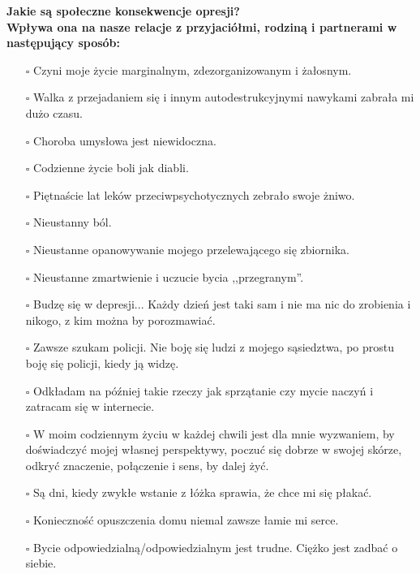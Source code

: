 \noindent\textcolor{ProcessBlue}{\textbf{\Large{Jakie są społeczne konsekwencje opresji?}}}\\
\textbf{\large{Wpływa ona na nasze relacje z przyjaciółmi, rodziną i partnerami w następujący sposób:}}
\begin{multicols}{2}
\begin{itemize}
\item[$\square$]{Czyni moje życie marginalnym, zdezorganizowanym i żałosnym.}
\item[$\square$]{Walka z przejadaniem się i innym autodestrukcyjnymi nawykami zabrała mi dużo czasu.}
\item[$\square$]{Choroba umysłowa jest niewidoczna.}
\item[$\square$]{Codzienne życie boli jak diabli.}
\item[$\square$]{Piętnaście lat leków przeciwpsychotycznych zebrało swoje żniwo.}
\item[$\square$]{Nieustanny ból.}
\item[$\square$]{Nieustanne opanowywanie mojego przelewającego się zbiornika.}
\item[$\square$]{Nieustanne zmartwienie i uczucie bycia ,,przegranym''.}
\item[$\square$]{Budzę się w depresji... Każdy dzień jest taki sam i nie ma nic do zrobienia i nikogo, z kim można by porozmawiać.}
\item[$\square$]{Zawsze szukam policji. Nie boję się ludzi z mojego sąsiedztwa, po prostu boję się policji, kiedy ją widzę.}
\item[$\square$]{Odkładam na później takie rzeczy jak sprzątanie czy mycie naczyń i zatracam się w internecie.}
\item[$\square$]{W moim codziennym życiu w każdej chwili jest dla mnie wyzwaniem, by doświadczyć mojej własnej perspektywy, poczuć się dobrze w swojej skórze, odkryć znaczenie, połączenie i sens, by dalej żyć.}
\item[$\square$]{Są dni, kiedy zwykłe wstanie z łóżka sprawia, że chce mi się płakać.}
\item[$\square$]{Konieczność opuszczenia domu niemal zawsze łamie mi serce.}
\item[$\square$]{Bycie odpowiedzialną/odpowiedzialnym jest trudne. Ciężko jest zadbać o siebie.}
\end{itemize}
\end{multicols}


